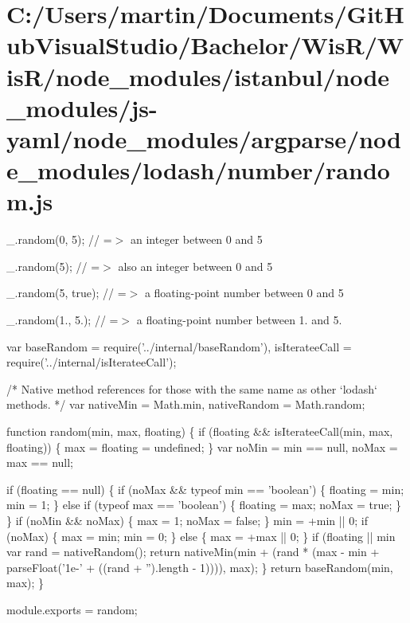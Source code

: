 \hypertarget{_c_1_2_users_2martin_2_documents_2_git_hub_visual_studio_2_bachelor_2_wis_r_2_wis_r_2node_module0cbcbb6d3992d4dafbdf0e4ccb6635aa}{}\section{C\+:/\+Users/martin/\+Documents/\+Git\+Hub\+Visual\+Studio/\+Bachelor/\+Wis\+R/\+Wis\+R/node\+\_\+modules/istanbul/node\+\_\+modules/js-\/yaml/node\+\_\+modules/argparse/node\+\_\+modules/lodash/number/random.\+js}
\+\_\+.\+random(0, 5); // =$>$ an integer between 0 and 5

\+\_\+.\+random(5); // =$>$ also an integer between 0 and 5

\+\_\+.\+random(5, true); // =$>$ a floating-\/point number between 0 and 5

\+\_\+.\+random(1., 5.); // =$>$ a floating-\/point number between 1. and 5.


\begin{DoxyCodeInclude}
var baseRandom = require(\textcolor{stringliteral}{'../internal/baseRandom'}),
    isIterateeCall = require(\textcolor{stringliteral}{'../internal/isIterateeCall'});

\textcolor{comment}{/* Native method references for those with the same name as other `lodash` methods. */}
var nativeMin = Math.min,
    nativeRandom = Math.random;

\textcolor{keyword}{function} random(min, max, floating) \{
  \textcolor{keywordflow}{if} (floating && isIterateeCall(min, max, floating)) \{
    max = floating = undefined;
  \}
  var noMin = min == null,
      noMax = max == null;

  \textcolor{keywordflow}{if} (floating == null) \{
    \textcolor{keywordflow}{if} (noMax && typeof min == \textcolor{stringliteral}{'boolean'}) \{
      floating = min;
      min = 1;
    \}
    \textcolor{keywordflow}{else} \textcolor{keywordflow}{if} (typeof max == \textcolor{stringliteral}{'boolean'}) \{
      floating = max;
      noMax = \textcolor{keyword}{true};
    \}
  \}
  \textcolor{keywordflow}{if} (noMin && noMax) \{
    max = 1;
    noMax = \textcolor{keyword}{false};
  \}
  min = +min || 0;
  \textcolor{keywordflow}{if} (noMax) \{
    max = min;
    min = 0;
  \} \textcolor{keywordflow}{else} \{
    max = +max || 0;
  \}
  \textcolor{keywordflow}{if} (floating || min %
    var rand = nativeRandom();
    \textcolor{keywordflow}{return} nativeMin(min + (rand * (max - min + parseFloat(\textcolor{stringliteral}{'1e-'} + ((rand + \textcolor{stringliteral}{''}).length - 1)))), max);
  \}
  \textcolor{keywordflow}{return} baseRandom(min, max);
\}

module.exports = random;
\end{DoxyCodeInclude}
 